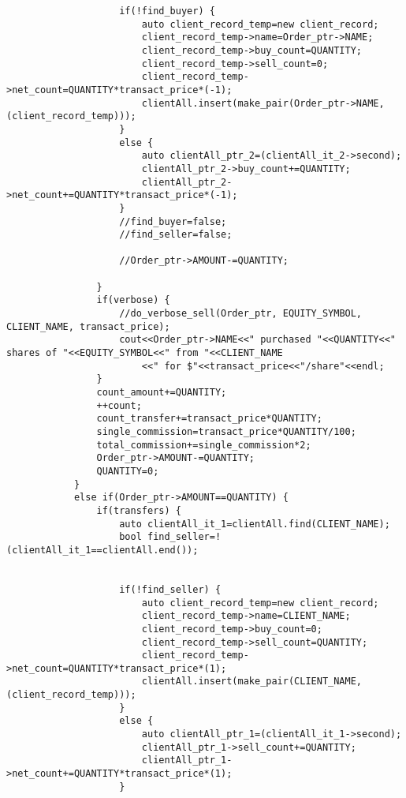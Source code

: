 \documentclass{article}
\begin{document}
\begin{spacing}{1.5}
\begin{lstlisting}
                    if(!find_buyer) {
                        auto client_record_temp=new client_record;
                        client_record_temp->name=Order_ptr->NAME;
                        client_record_temp->buy_count=QUANTITY;
                        client_record_temp->sell_count=0;
                        client_record_temp->net_count=QUANTITY*transact_price*(-1);
                        clientAll.insert(make_pair(Order_ptr->NAME, (client_record_temp)));
                    }
                    else {
                        auto clientAll_ptr_2=(clientAll_it_2->second);
                        clientAll_ptr_2->buy_count+=QUANTITY;
                        clientAll_ptr_2->net_count+=QUANTITY*transact_price*(-1);
                    }
                    //find_buyer=false;
                    //find_seller=false;

                    //Order_ptr->AMOUNT-=QUANTITY;

                }
                if(verbose) {
                    //do_verbose_sell(Order_ptr, EQUITY_SYMBOL, CLIENT_NAME, transact_price);
                    cout<<Order_ptr->NAME<<" purchased "<<QUANTITY<<" shares of "<<EQUITY_SYMBOL<<" from "<<CLIENT_NAME
                        <<" for $"<<transact_price<<"/share"<<endl;
                }
                count_amount+=QUANTITY;
                ++count;
                count_transfer+=transact_price*QUANTITY;
                single_commission=transact_price*QUANTITY/100;
                total_commission+=single_commission*2;
                Order_ptr->AMOUNT-=QUANTITY;
                QUANTITY=0;
            }
            else if(Order_ptr->AMOUNT==QUANTITY) {
                if(transfers) {
                    auto clientAll_it_1=clientAll.find(CLIENT_NAME);
                    bool find_seller=!(clientAll_it_1==clientAll.end());


                    if(!find_seller) {
                        auto client_record_temp=new client_record;
                        client_record_temp->name=CLIENT_NAME;
                        client_record_temp->buy_count=0;
                        client_record_temp->sell_count=QUANTITY;
                        client_record_temp->net_count=QUANTITY*transact_price*(1);
                        clientAll.insert(make_pair(CLIENT_NAME, (client_record_temp)));
                    }
                    else {
                        auto clientAll_ptr_1=(clientAll_it_1->second);
                        clientAll_ptr_1->sell_count+=QUANTITY;
                        clientAll_ptr_1->net_count+=QUANTITY*transact_price*(1);
                    }


\end{lstlisting}
\end{spacing}
\end{document}
